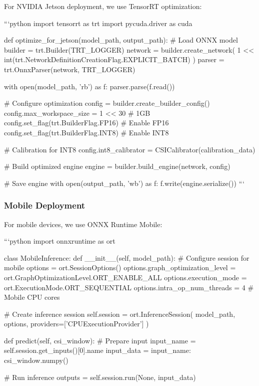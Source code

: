\documentclass[10pt,journal,compsoc]{IEEEtran}
\begin{document}
For NVIDIA Jetson deployment, we use TensorRT optimization:

```python
import tensorrt as trt
import pycuda.driver as cuda

def optimize_for_jetson(model_path, output_path):
    # Load ONNX model
    builder = trt.Builder(TRT_LOGGER)
    network = builder.create_network(
        1 << int(trt.NetworkDefinitionCreationFlag.EXPLICIT_BATCH)
    )
    parser = trt.OnnxParser(network, TRT_LOGGER)
    
    with open(model_path, 'rb') as f:
        parser.parse(f.read())
    
    # Configure optimization
    config = builder.create_builder_config()
    config.max_workspace_size = 1 << 30  # 1GB
    config.set_flag(trt.BuilderFlag.FP16)  # Enable FP16
    config.set_flag(trt.BuilderFlag.INT8)  # Enable INT8
    
    # Calibration for INT8
    config.int8_calibrator = CSICalibrator(calibration_data)
    
    # Build optimized engine
    engine = builder.build_engine(network, config)
    
    # Save engine
    with open(output_path, 'wb') as f:
        f.write(engine.serialize())
```

\subsubsection{Mobile Deployment}

For mobile devices, we use ONNX Runtime Mobile:

```python
import onnxruntime as ort

class MobileInference:
    def __init__(self, model_path):
        # Configure session for mobile
        options = ort.SessionOptions()
        options.graph_optimization_level = ort.GraphOptimizationLevel.ORT_ENABLE_ALL
        options.execution_mode = ort.ExecutionMode.ORT_SEQUENTIAL
        options.intra_op_num_threads = 4  # Mobile CPU cores
        
        # Create inference session
        self.session = ort.InferenceSession(
            model_path, 
            options,
            providers=['CPUExecutionProvider']
        )
        
    def predict(self, csi_window):
        # Prepare input
        input_name = self.session.get_inputs()[0].name
        input_data = {input_name: csi_window.numpy()}
        
        # Run inference
        outputs = self.session.run(None, input_data)
        
\end{document}
